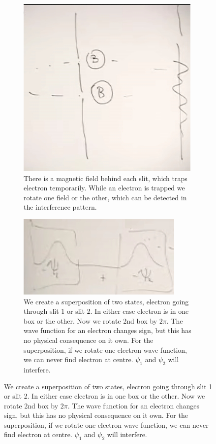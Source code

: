 \documentclass[]{article}
\begin{document}
\begin{figure}[H]
	\caption{A 2 slit experiment to detect rotation by $2\pi$}
	\begin{subfigure}[t]{0.45\textwidth}
		\begin{center}
			\caption{There is a magnetic field behind each slit, which traps electron temporarily. While an electron is trapped we rotate one field or the other, which can be detected in the interference pattern.}\label{fig:particles3-2-2slit}
			\includegraphics[width=\textwidth]{particles3-2-2slit}
		\end{center}
	\end{subfigure}
	\begin{subfigure}[t]{0.45\textwidth}
		\begin{center}
			\caption{We create a superposition of two states, electron going through slit 1 or slit 2. In either case electron is in one box or the other. Now we rotate 2nd box by $2\pi$. The wave function for an electron changes sign, but this has no physical consequence on it own. For the superposition, if we rotate one electron wave function, we can never find electron at centre. $\psi_1$ and $\psi_2$ will interfere.}\label{fig:particles3-2-2slit-wave-function-2-2slit}
			\includegraphics[width=\textwidth]{particles3-2-2slit-wave-function}

\end{center}
\end{subfigure}
\end{figure}
\end{document}
